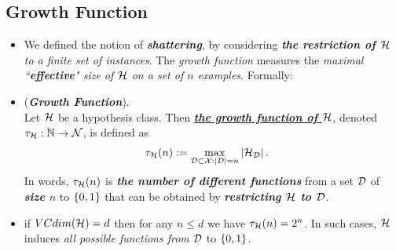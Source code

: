 \documentclass[11pt]{article}
\begin{document}
\subsection{Growth Function}
\begin{itemize}
\item \begin{remark}
We defined the notion of \emph{\textbf{shattering}}, by considering \emph{\textbf{the restriction of ${\mathcal H}$} to a finite set of instances}. The \emph{growth function} measures the \emph{maximal ``\textbf{effective}" size of ${\mathcal H}$ on a set of $n$ examples}. Formally:
\end{remark}

\item \begin{definition} (\emph{\textbf{Growth Function}}). \\
Let ${\mathcal H}$ be a hypothesis class. Then \underline{\emph{\textbf{the growth function of ${\mathcal H}$}}}, denoted $\tau_{{\mathcal H}}: {\mathbb N} \to {\mathcal N}$, is defined as
\begin{align*}
\tau_{{\mathcal H}}(n) &:= \max_{{\mathcal D} \subset {\mathcal X}: \left\lvert {\mathcal D} \right\rvert = n}\left\lvert {\mathcal H}_{{\mathcal D}} \right\rvert.
\end{align*}
In words, $\tau_{{\mathcal H}}(n)$ is \textbf{\emph{the number of different functions}} from a set ${\mathcal D}$ of \emph{\textbf{size $n$}} to $\left\{0,1\right\}$ that can be obtained by \emph{\textbf{restricting ${\mathcal H}$ to ${\mathcal D}$}}.
\end{definition}

\item \begin{remark}
if $VCdim({\mathcal H}) = d$ then for any $n \le d$ we have $\tau_{{\mathcal H}}(n) = 2^n$. In such cases, ${\mathcal H}$ induces \emph{all possible functions from} ${\mathcal D}$ to $\left\{0,1\right\}$. 
\end{remark}


\end{itemize}
\end{document}

